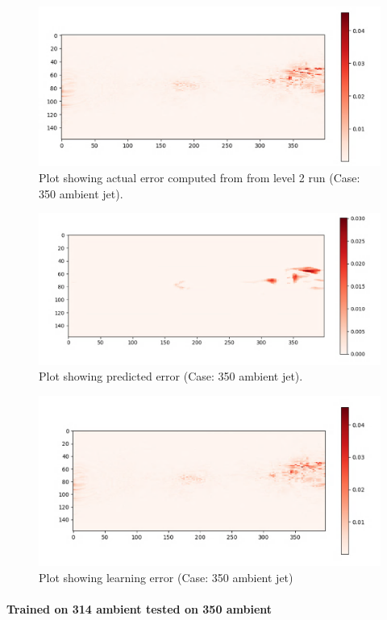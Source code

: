 \documentclass{article}
\begin{document}
\begin{figure}[h!]
    \centering
    \includegraphics[width = 0.8\linewidth]{figures/350_12_actual.png}
    \caption{Plot showing actual error computed from from level 2 run (Case: 350 ambient jet).}
    \label{amr_err}
\end{figure}

\begin{figure}[h!]
    \centering
    \includegraphics[width = 0.8\linewidth]{figures/350_12_pred.png}
    \caption{Plot showing predicted error (Case: 350 ambient jet).}
    \label{amr_err}
\end{figure}

\begin{figure}[h!]
    \centering
    \includegraphics[width = 0.8\linewidth]{figures/350_12_error.png}
    \caption{Plot showing learning error (Case: 350 ambient jet)}
    \label{amr_err}
\end{figure}

\paragraph{Trained on 314 ambient tested on 350 ambient}
\end{document}
